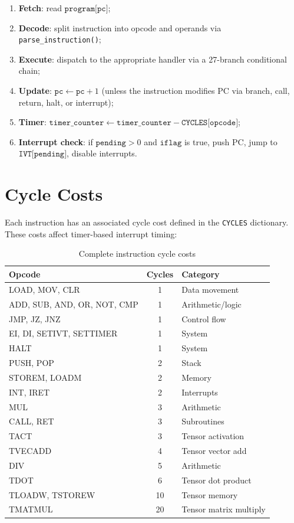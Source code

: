 \documentclass[10pt,a4paper,twoside]{book}
\begin{document}
\begin{enumerate}
    \item \textbf{Fetch}: read $\texttt{program[pc]}$;
    \item \textbf{Decode}: split instruction into opcode and operands via
          \texttt{parse\_instruction()};
    \item \textbf{Execute}: dispatch to the appropriate handler via a 27-branch
          conditional chain;
    \item \textbf{Update}: $\texttt{pc} \gets \texttt{pc} + 1$ (unless the instruction
          modifies PC via branch, call, return, halt, or interrupt);
    \item \textbf{Timer}: $\texttt{timer\_counter} \gets \texttt{timer\_counter}
          - \texttt{CYCLES[opcode]}$;
    \item \textbf{Interrupt check}: if $\texttt{pending} > 0$ and $\texttt{iflag}$
          is true, push PC, jump to $\texttt{IVT[pending]}$, disable interrupts.
\end{enumerate}

\section{Cycle Costs}

Each instruction has an associated cycle cost defined in the \texttt{CYCLES} dictionary.
These costs affect timer-based interrupt timing:

\begin{table}[H]
\centering
\caption{Complete instruction cycle costs}
\label{tab:allcycles}
\begin{tabular}{lcl}
\toprule
Opcode & Cycles & Category \\
\midrule
LOAD, MOV, CLR & 1 & Data movement \\
ADD, SUB, AND, OR, NOT, CMP & 1 & Arithmetic/logic \\
JMP, JZ, JNZ & 1 & Control flow \\
EI, DI, SETIVT, SETTIMER & 1 & System \\
HALT & 1 & System \\
PUSH, POP & 2 & Stack \\
STOREM, LOADM & 2 & Memory \\
INT, IRET & 2 & Interrupts \\
MUL & 3 & Arithmetic \\
CALL, RET & 3 & Subroutines \\
TACT & 3 & Tensor activation \\
TVECADD & 4 & Tensor vector add \\
DIV & 5 & Arithmetic \\
TDOT & 6 & Tensor dot product \\
TLOADW, TSTOREW & 10 & Tensor memory \\
TMATMUL & 20 & Tensor matrix multiply \\
\bottomrule
\end{tabular}
\end{table}
\end{document}
